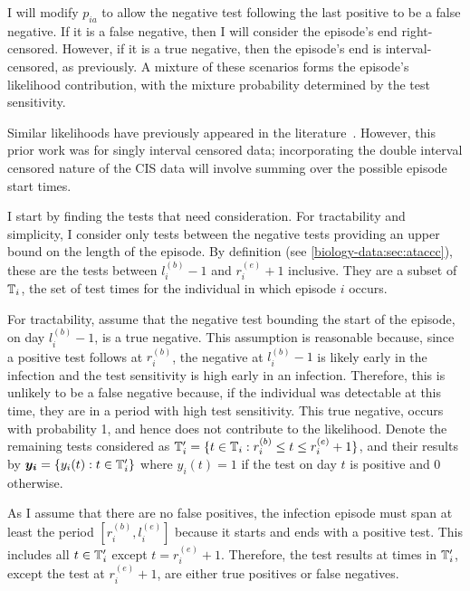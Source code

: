 \documentclass[thesis.tex]{subfiles}
\begin{document}
I will modify $p_{ia}$ to allow the negative test following the last positive to be a false negative.
If it is a false negative, then I will consider the episode's end right-censored.
However, if it is a true negative, then the episode's end is interval-censored, as previously.
A mixture of these scenarios forms the episode's likelihood contribution, with the mixture probability determined by the test sensitivity.

Similar likelihoods have previously appeared in the literature~\autocite[e.g.][eq.\ (2)]{piresIntervalMisclassify}.
However, this prior work was for singly interval censored data; incorporating the double interval censored nature of the CIS data will involve summing over the possible episode start times.

I start by finding the tests that need consideration.
For tractability and simplicity, I consider only tests between the negative tests providing an upper bound on the length of the episode.
By definition (see \cref{biology-data:sec:ataccc}), these are the tests between $l_i^{(b)} - 1$ and $r_i^{(e)} + 1$ inclusive.
They are a subset of $\mathbb{T}_i$, the set of test times for the individual in which episode $i$ occurs.

For tractability, assume that the negative test bounding the start of the episode, on day $l_i^{(b)}-1$, is a true negative.
This assumption is reasonable because, since a positive test follows at $r_i^{(b)}$, the negative at $l_i^{(b)}-1$ is likely early in the infection and the test sensitivity is high early in an infection.
Therefore, this is unlikely to be a false negative because, if the individual was detectable at this time, they are in a period with high test sensitivity.
This true negative, occurs with probability 1, and hence does not contribute to the likelihood.
Denote the remaining tests considered as $\mathbb{T}'_i = \{ t \in \mathbb{T}_i : r_i^{(b)} \leq t \leq r_i^{(e)} + 1 \}$, and their results by $\bm{y_i} = \{ y_i(t) : t \in \mathbb{T}'_i \}$ where $y_i(t) = 1$ if the test on day $t$ is positive and 0 otherwise.

As I assume that there are no false positives, the infection episode must span at least the period $[r^{(b)}_i, l^{(e)}_i]$ because it starts and ends with a positive test.
This includes all $t \in \mathbb{T}'_i$ except $t = r_i^{(e)}+1$.
Therefore, the test results at times in $\mathbb{T}_i'$, except the test at $r_i^{(e)}+1$, are either true positives or false negatives.
\end{document}

